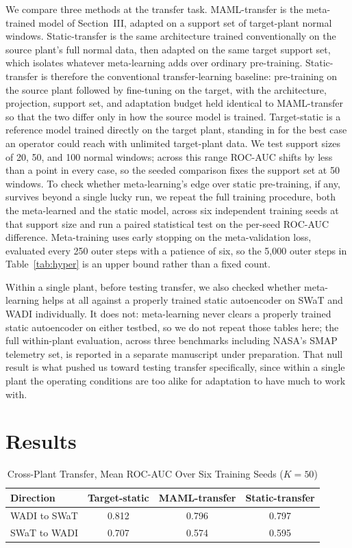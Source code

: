 \documentclass[conference]{IEEEtran}
\begin{document}
We compare three methods at the transfer task. MAML-transfer is the
meta-trained model of Section~III, adapted on a support set of target-plant
normal windows. Static-transfer is the same architecture trained
conventionally on the source plant's full normal data, then adapted on the
same target support set, which isolates whatever meta-learning adds over
ordinary pre-training.
Static-transfer is therefore the conventional transfer-learning baseline:
pre-training on the source plant followed by fine-tuning on the target,
with the architecture, projection, support set, and adaptation budget held
identical to MAML-transfer so that the two differ only in how the source
model is trained.
Target-static is a reference model trained directly on the target plant,
standing in for the best case an operator could reach with unlimited
target-plant data. We test support sizes of 20, 50, and 100 normal windows;
across this range ROC-AUC shifts by less than a point in every case, so the
seeded comparison fixes the support set at 50 windows. To check whether
meta-learning's edge over static pre-training, if any, survives beyond a
single lucky run, we repeat the full training procedure, both the
meta-learned and the static model, across six independent training seeds at
that support size and run a paired statistical test on the per-seed ROC-AUC
difference. Meta-training uses early stopping on the meta-validation loss,
evaluated every 250 outer steps with a patience of six, so the 5,000 outer
steps in Table~\ref{tab:hyper} is an upper bound rather than a fixed count.

Within a single plant, before testing transfer, we also checked whether
meta-learning helps at all against a properly trained static autoencoder on
SWaT and WADI individually. It does not: meta-learning never clears a
properly trained static autoencoder on either testbed, so we do not repeat
those tables here; the full within-plant evaluation, across three benchmarks
including NASA's SMAP telemetry set, is reported in a separate manuscript
under preparation. That null result is what pushed us toward testing
transfer specifically, since within a single plant the operating conditions
are too alike for adaptation to have much to work with.

\section{Results}

\begin{table}[t]
\caption{Cross-Plant Transfer, Mean ROC-AUC Over Six Training Seeds
($K=50$)}
\label{tab:results}
\centering
\footnotesize
\begin{tabular}{@{}lccc@{}}
\toprule
Direction & Target-static & MAML-transfer & Static-transfer \\
\midrule
WADI to SWaT & 0.812 & 0.796 & 0.797 \\
SWaT to WADI & 0.707 & 0.574 & 0.595 \\
\bottomrule
\end{tabular}
\end{table}
\end{document}
